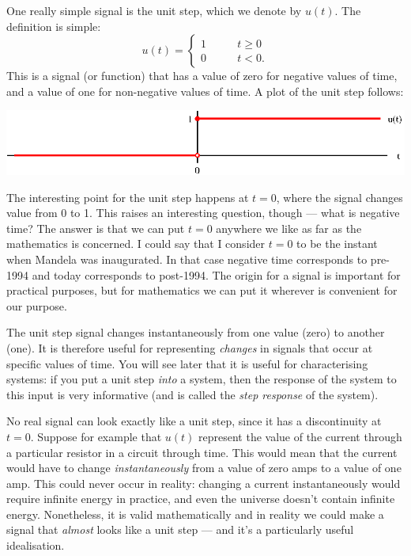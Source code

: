 \documentclass[10pt]{beamer}
\begin{document}
One really simple signal is the unit step, which we denote by $u(t)$.  The definition is simple:
\begin{equation*}
  u(t) = \begin{cases}
    1 \qquad & t \geq 0 \\
    0 \qquad & t<0.
  \end{cases}
\end{equation*}
This is a signal (or function) that has a value of zero for negative values of time, and a value of one for non-negative values of time.  A plot of the unit step follows:
\begin{center}
  \includegraphics{unitstep}
\end{center}
The interesting point for the unit step happens at $t=0$, where the signal changes value from 0 to 1.  This raises an interesting question, though --- what is negative time?  The answer is that we can put $t=0$ anywhere we like as far as the mathematics is concerned.  I could say that I consider $t=0$ to be the instant when Mandela was inaugurated.  In that case negative time corresponds to pre-1994 and today corresponds to post-1994.  The origin for a signal is important for practical purposes, but for mathematics we can put it wherever is convenient for our purpose.

The unit step signal changes instantaneously from one value (zero) to another (one).  It is therefore useful for representing {\em changes} in signals that occur at specific values of time.  You will see later that it is useful for characterising systems:  if you put a unit step {\em into} a system, then the response of the system to this input is very informative (and is called the {\em step response} of the system).

No real signal can look exactly like a unit step, since it has a discontinuity at $t=0$.  Suppose for example that $u(t)$ represent the value of the current through a particular resistor in a circuit through time.  This would mean that the current would have to change {\em instantaneously} from a value of zero amps to a value of one amp.  This could never occur in reality:  changing a current instantaneously would require infinite energy in practice, and even the universe doesn't contain infinite energy.  Nonetheless, it is valid mathematically and in reality we could make a signal that {\em almost} looks like a unit step --- and it's a particularly useful idealisation.
\end{document}
